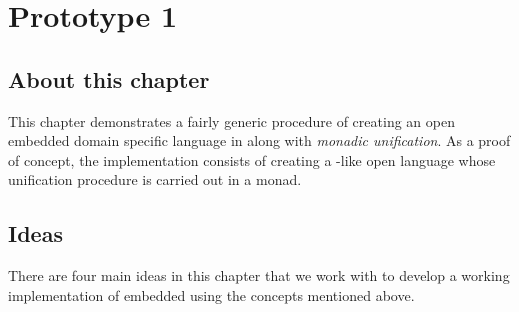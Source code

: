 \documentclass[thesis-solanki.tex]{subfiles}
\begin{document}
\chapter{Prototype 1}{\label{proto1}}



\section{About this chapter}

This chapter demonstrates a fairly generic procedure of creating an open embedded domain specific language in
 along with \textit{monadic unification}.
As a proof of concept, the implementation consists of creating a -like open language whose
unification procedure is carried out in a monad.


\section{Ideas}
There are four main ideas in this chapter that we work with to develop a working implementation of embedded
 using the concepts mentioned above.
\end{document}
